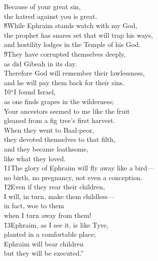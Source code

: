 \begin{poetry}
\poeml Because of your great sin, \\
\poemll    the hatred against you is great. \\
\poeml \v{8}While Ephraim stands watch with my God, \\
\poemll    the prophet has snares set that will trap his ways, \\
\poemlll       and hostility lodges in the Temple of his God. \\
\poeml \v{9}They have corrupted themselves deeply, \\
\poemll    as did Gibeah in its day. \\
\poeml Therefore God will remember their lawlessness, \\
\poemll    and he will pay them back for their sins. \\
\poeml \v{10}``I found Israel, \\
\poemll    as one finds grapes in the wilderness; \\
\poeml Your ancestors seemed to me like the fruit \\
\poemll    gleaned from a fig tree's first harvest. \\
\poeml When they went to Baal-peor, \\
\poemll    they devoted themselves to that filth, \\
\poeml and they became loathsome, \\
\poemll    like what they loved. \\
\poeml \v{11}The glory of Ephraim will fly away like a bird--- \\
\poemll    no birth, no pregnancy, not even a conception. \\
\poeml \v{12}Even if they rear their children, \\
\poemll    I will, in turn, make them childless--- \\
\poeml in fact, woe to them \\
\poemll    when I turn away from them! \\
\poeml \v{13}Ephraim, as I see it, is like Tyre, \\
\poemll    planted in a comfortable place; \\
\poeml Ephraim will bear children \\
\poemll    but they will be executed.'' \\

\end{poetry}
